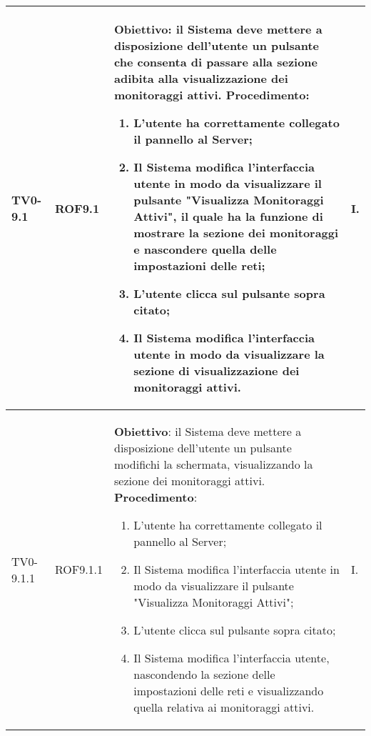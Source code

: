 \begin{longtable}{|C{.15\textwidth}|C{.13\textwidth}|m{.52\textwidth}|C{.08\textwidth}|}
TV0-9.1 & ROF9.1 &
	\textbf{Obiettivo}: il Sistema deve mettere a disposizione dell'utente un pulsante che consenta di passare alla sezione adibita alla visualizzazione dei monitoraggi attivi. \newline
	\textbf{Procedimento}:
	\begin{enumerate}
		\item L'utente ha correttamente collegato il pannello al Server;
		\item Il Sistema modifica l'interfaccia utente in modo da visualizzare il pulsante "Visualizza Monitoraggi Attivi", il quale ha la funzione di mostrare la sezione dei monitoraggi e nascondere quella delle impostazioni delle reti;
		\item L'utente clicca sul pulsante sopra citato;
		\item Il Sistema modifica l'interfaccia utente in modo da visualizzare la sezione di visualizzazione dei monitoraggi attivi.
	\end{enumerate}
	& I. \\
\hline	

TV0-9.1.1 & ROF9.1.1 &
	\textbf{Obiettivo}: il Sistema deve mettere a disposizione dell'utente un pulsante modifichi la schermata, visualizzando la sezione dei monitoraggi attivi. \newline
	\textbf{Procedimento}:
	\begin{enumerate}
		\item L'utente ha correttamente collegato il pannello al Server;
		\item Il Sistema modifica l'interfaccia utente in modo da visualizzare il pulsante "Visualizza Monitoraggi Attivi";
		\item L'utente clicca sul pulsante sopra citato;
		\item Il Sistema modifica l'interfaccia utente, nascondendo la sezione delle impostazioni delle reti e visualizzando quella relativa ai monitoraggi attivi.
	\end{enumerate}
	& I. \\
\hline	


\end{longtable}
